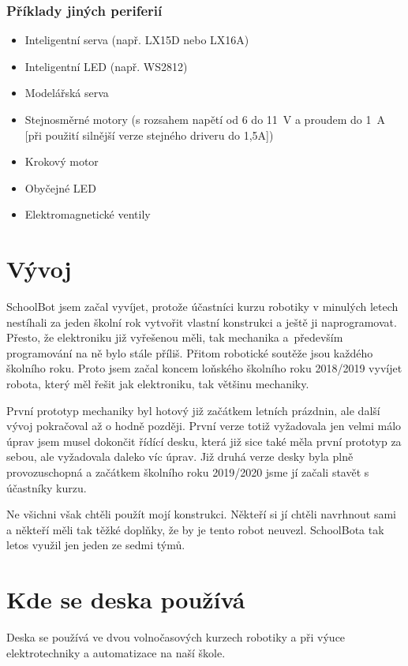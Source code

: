 \documentclass{template/socthesis}
\begin{document}
\subsubsection{Příklady jiných periferií}

\begin{itemize}
	\item Inteligentní serva (např. LX15D nebo LX16A)
	\item Inteligentní LED (např. WS2812)
	\item Modelářská serva
	\item Stejnosměrné motory (s rozsahem napětí od 6 do 11~V a proudem do 1~A [při použití silnější verze stejného driveru do 1,5A])
	\item Krokový motor
	\item Obyčejné LED
	\item Elektromagnetické ventily
\end{itemize}

\section{Vývoj}

SchoolBot jsem začal vyvíjet, protože účastníci kurzu robotiky v minulých letech nestíhali za jeden školní rok vytvořit vlastní konstrukci a ještě ji naprogramovat. Přesto, že elektroniku již vyřešenou měli, tak mechanika a~především programování na ně bylo stále příliš. Přitom robotické soutěže jsou  každého školního roku. Proto jsem začal koncem loň\-ské\-ho školního roku 2018/2019 vyvíjet robota, který měl řešit jak elektroniku, tak většinu mechaniky. 

První prototyp mechaniky byl hotový již začátkem letních prázdnin, ale další vývoj pokračoval až o hodně později. První verze totiž vyžadovala jen velmi málo úprav jsem musel dokončit řídící desku, která již sice také měla první prototyp za sebou, ale vyžadovala daleko víc úprav. Již druhá verze desky byla plně provozuschopná a začátkem školního roku 2019/2020 jsme jí začali stavět s účastníky kurzu.

 Ne všichni však chtěli použít mojí konstrukci. Někteří si jí chtěli navrhnout sami a někteří měli tak těžké doplňky, že by je tento robot neuvezl. 
SchoolBota tak letos využil jen jeden ze sedmi týmů.

\section{Kde se deska používá}
Deska se používá ve dvou volnočasových kurzech robotiky a při výuce elektrotechniky a automatizace na naší škole.
\end{document}
